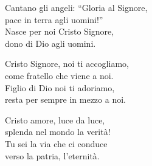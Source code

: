 
\strofa Cantano gli angeli: ``Gloria al Signore,\\
pace in terra agli uomini!''\\
Nasce per noi Cristo Signore,\\
dono di Dio agli uomini.

\spazio


\spazio

\strofa Cristo Signore, noi ti accogliamo,\\
come fratello che viene a noi.\\
Figlio di Dio noi ti adoriamo,\\
resta per sempre in mezzo a noi.

\spazio


\spazio

\strofa Cristo amore, luce da luce,\\
splenda nel mondo la verità!\\
Tu sei la via che ci conduce\\
verso la patria, l'eternità.

\spazio

